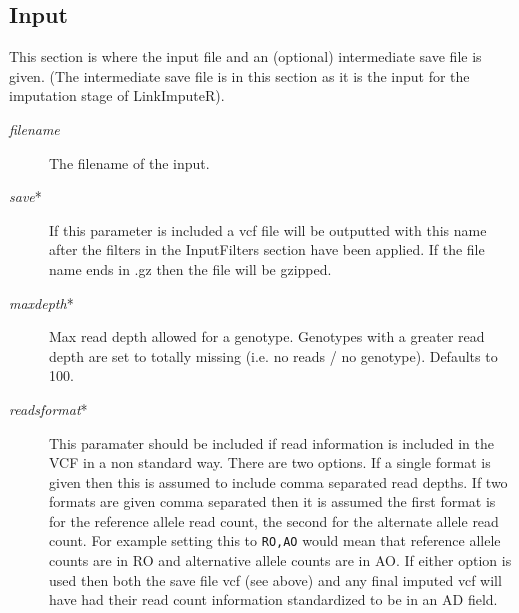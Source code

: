 \documentclass[10pt]{report}
\begin{document}
\subsection{Input}
This section is where the input file and an (optional) intermediate save file is given. (The intermediate save file is in this section as it is the input for the imputation stage of LinkImputeR).
\begin{description}
\item[\emph{filename}] The filename of the input.
\item[\emph{save}*] If this parameter is included a vcf file will be outputted with this name after the filters in the InputFilters section have been applied.  If the file name ends in .gz then the file will be gzipped.
\item[\emph{maxdepth}*] Max read depth allowed for a genotype.  Genotypes with a greater read depth are set to totally missing (i.e. no reads / no genotype). Defaults to 100.
\item[\emph{readsformat}*] This paramater should be included if read information is included in the VCF in a non standard way.  There are two options.  If a single format is given then this is assumed to include comma separated read depths.  If two formats are given comma separated then it is assumed the first format is for the reference allele read count, the second for the alternate allele read count.  For example setting this to \texttt{RO,AO} would mean that reference allele counts are in RO and alternative allele counts are in AO.  If either option is used then both the save file vcf (see above) and any final imputed vcf will have had their read count information standardized to be in an AD field.
\end{description}
\end{document}
